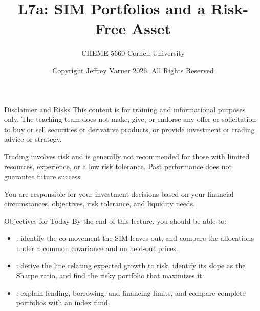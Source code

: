 \documentclass[aspectratio=169,11pt]{beamer}
\title{\texorpdfstring{{\vnheavy L7a}}{L7a}: SIM Portfolios and a Risk-Free Asset}
\subtitle{CHEME 5660 Cornell University}
\author{Copyright Jeffrey Varner 2026. All Rights Reserved}
\begin{document}
\vntitlepage

\begin{frame}{Disclaimer and Risks}
  \vspace{0.6em}
  \textbf{} This content is for training and informational
  purposes only. The teaching team does not make, give, or endorse any offer or
  solicitation to buy or sell securities or derivative products, or provide
  investment or trading advice or strategy.

  \vspace{1.1em}
  \textbf{} Trading involves risk and is generally not recommended for
  those with limited resources, experience, or a low risk tolerance. Past
  performance does not guarantee future success.

  \vspace{1.1em}
  \textbf{} You are responsible for your investment decisions
  based on your financial circumstances, objectives, risk tolerance, and
  liquidity needs.
\end{frame}

\begin{frame}{Objectives for Today}
By the end of this lecture, you should be able to:
\begin{itemize}\setlength{\itemsep}{0.9em}
\item {}:
identify the co-movement the SIM leaves out, and compare the allocations under a
common covariance and on held-out prices.
\item {}:
derive the line relating expected growth to risk, identify its slope as the
Sharpe ratio, and find the risky portfolio that maximizes it.
\item {}: explain lending,
borrowing, and financing limits, and compare complete portfolios with an index fund.
\end{itemize}
\end{frame}
\end{document}

